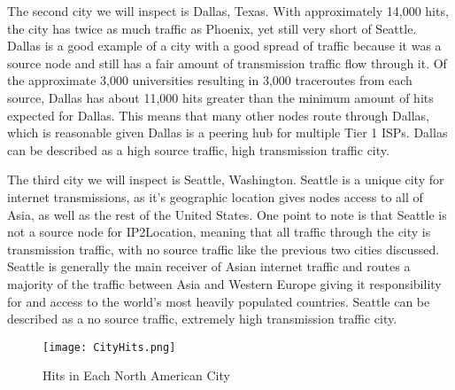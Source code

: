 \documentclass{sigcomm-alternate}
\begin{document}
The second city we will inspect is Dallas, Texas. With approximately 14,000 hits, the city has twice as much traffic as Phoenix, yet still very short of Seattle. Dallas is a good example of a city with a good spread of traffic because it was a source node and still has a fair amount of transmission traffic flow through it. Of the approximate 3,000 universities resulting in 3,000 traceroutes from each source, Dallas has about 11,000 hits greater than the minimum amount of hits expected for Dallas. This means that many other nodes route through Dallas, which is reasonable given Dallas is a peering hub for multiple Tier 1 ISPs. Dallas can be described as a high source traffic, high transmission traffic city. 

The third city we will inspect is Seattle, Washington. Seattle is a unique city for internet transmissions, as it’s geographic location gives nodes access to all of Asia, as well as the rest of the United States. One point to note is that Seattle is not a source node for IP2Location, meaning that all traffic through the city is transmission traffic, with no source traffic like the previous two cities discussed. Seattle is generally the main receiver of Asian internet traffic and routes a majority of the traffic between Asia and Western Europe giving it responsibility for and access to the world’s most heavily populated countries. Seattle can be described as a no source traffic, extremely high transmission traffic city.


\begin{figure}[h!]
  \caption{Hits in Each North American City}
  \centering
    \texttt{[image: CityHits.png]}
\end{figure}
\end{document}
